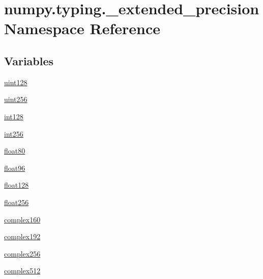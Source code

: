 \hypertarget{namespacenumpy_1_1typing_1_1__extended__precision}{}\section{numpy.\+typing.\+\_\+extended\+\_\+precision Namespace Reference}
\label{namespacenumpy_1_1typing_1_1__extended__precision}
\subsection*{Variables}
\begin{DoxyCompactItemize}
\item 
\hyperlink{namespacenumpy_1_1typing_1_1__extended__precision_a9edf85d9f9cb393479b9b07a4852c036}{uint128}
\item 
\hyperlink{namespacenumpy_1_1typing_1_1__extended__precision_af7fcf2c22a0d6fd3d905e737ffcb128a}{uint256}
\item 
\hyperlink{namespacenumpy_1_1typing_1_1__extended__precision_af85658c55af786e5b89e09b77f1e05cd}{int128}
\item 
\hyperlink{namespacenumpy_1_1typing_1_1__extended__precision_aaaf4f2e84c5b0c6b62234d4915638dea}{int256}
\item 
\hyperlink{namespacenumpy_1_1typing_1_1__extended__precision_ad5de0469de1c4392275e7ce8742a737d}{float80}
\item 
\hyperlink{namespacenumpy_1_1typing_1_1__extended__precision_a17a3892de608f973e507e82b3b673920}{float96}
\item 
\hyperlink{namespacenumpy_1_1typing_1_1__extended__precision_a1a3465a840479ac3801a97543e6c825e}{float128}
\item 
\hyperlink{namespacenumpy_1_1typing_1_1__extended__precision_a76acfc96daa1de040aeee074e8515647}{float256}
\item 
\hyperlink{namespacenumpy_1_1typing_1_1__extended__precision_a934cc03d299251ddd34afff4f903d683}{complex160}
\item 
\hyperlink{namespacenumpy_1_1typing_1_1__extended__precision_a1a4b7eaf4879e68ccc4f794800cc4bfc}{complex192}
\item 
\hyperlink{namespacenumpy_1_1typing_1_1__extended__precision_a31f11275d48e1ce685f42cfd6f3e8c1d}{complex256}
\item 
\hyperlink{namespacenumpy_1_1typing_1_1__extended__precision_aff321fc15071207035731e7e022915ae}{complex512}
\end{DoxyCompactItemize}


